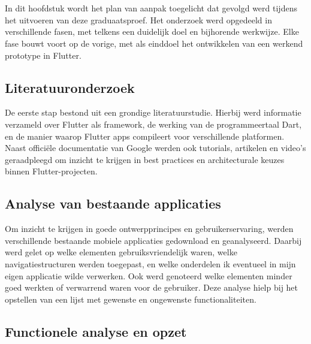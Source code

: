 

\chapter{}%
\label{ch:methodologie}

In dit hoofdstuk wordt het plan van aanpak toegelicht dat gevolgd werd tijdens het uitvoeren van deze graduaatsproef. Het onderzoek werd opgedeeld in verschillende fasen, met telkens een duidelijk doel en bijhorende werkwijze. Elke fase bouwt voort op de vorige, met als einddoel het ontwikkelen van een werkend prototype in Flutter.

\section{Literatuuronderzoek}

De eerste stap bestond uit een grondige literatuurstudie. Hierbij werd informatie verzameld over Flutter als framework, de werking van de programmeertaal Dart, en de manier waarop Flutter apps compileert voor verschillende platformen. Naast officiële documentatie van Google werden ook tutorials, artikelen en video’s geraadpleegd om inzicht te krijgen in best practices en architecturale keuzes binnen Flutter-projecten.

\section{Analyse van bestaande applicaties}

Om inzicht te krijgen in goede ontwerpprincipes en gebruikerservaring, werden verschillende bestaande mobiele applicaties gedownload en geanalyseerd. Daarbij werd gelet op welke elementen gebruiksvriendelijk waren, welke navigatiestructuren werden toegepast, en welke onderdelen ik eventueel in mijn eigen applicatie wilde verwerken. Ook werd genoteerd welke elementen minder goed werkten of verwarrend waren voor de gebruiker. Deze analyse hielp bij het opstellen van een lijst met gewenste en ongewenste functionaliteiten.

\section{Functionele analyse en opzet}

